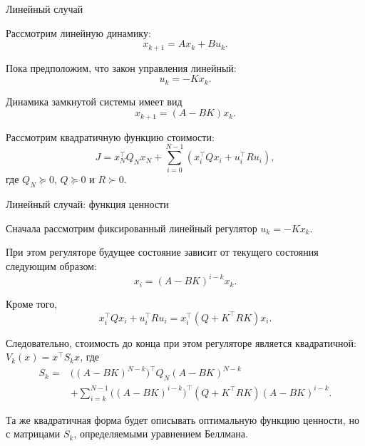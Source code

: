 \documentclass{beamer}
\begin{document}
	
	\begin{frame}{Линейный случай}
		\begin{flushleft}
			
			Рассмотрим линейную динамику:
			\[
			x_{k+1}=Ax_k+Bu_k.
			\]
			
			Пока предположим, что закон управления линейный:
			\[
			u_k=-Kx_k.
			\]
			
			Динамика замкнутой системы имеет вид
			\[
			x_{k+1}=(A-BK)x_k.
			\]
			
			\medskip
			
			Рассмотрим квадратичную функцию стоимости:
			\[
			J=x_N^\top Q_Nx_N+
			\sum_{i=0}^{N-1}
			\left(x_i^\top Qx_i+u_i^\top Ru_i\right),
			\]
			где $Q_N\succeq0$, $Q\succeq0$ и $R\succ0$.
			
		\end{flushleft}
	\end{frame}
	
	\begin{frame}{Линейный случай: функция ценности}
		\begin{flushleft}
			{\small
				Сначала рассмотрим фиксированный линейный регулятор
				$u_k=-Kx_k$.
				
				При этом регуляторе будущее состояние зависит от
				текущего состояния следующим образом:
				\[
				x_i=(A-BK)^{i-k}x_k.
				\]
				
				Кроме того,
				\[
				x_i^\top Qx_i+u_i^\top Ru_i
				=x_i^\top(Q+K^\top RK)x_i.
				\]
				
				\medskip
				
				Следовательно, стоимость до конца при этом регуляторе
				является квадратичной: $V_k(x)=x^\top S_kx$, где
				\[
				\begin{aligned}
					S_k={}&
					\bigl((A-BK)^{N-k}\bigr)^\top
					Q_N(A-BK)^{N-k}\\
					&+\sum_{i=k}^{N-1}
					\bigl((A-BK)^{i-k}\bigr)^\top
					(Q+K^\top RK)
					(A-BK)^{i-k}.
				\end{aligned}
				\]
				
				\medskip
				
				Та же квадратичная форма будет описывать оптимальную
				функцию ценности, но с матрицами $S_k$, определяемыми
				уравнением Беллмана.}
			
		\end{flushleft}
	\end{frame}
	
\end{document}
